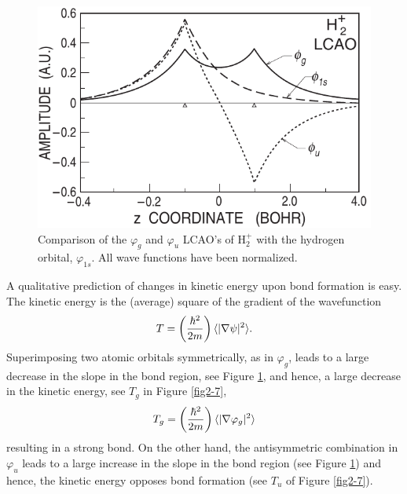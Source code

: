 \begin{figure}
\includegraphics[scale=0.75]{fig2-06}
\caption{Comparison of the $\varphi_g$ and $\varphi_u$ LCAO's of
  H$_2^+$ with the hydrogen orbital, $\varphi_{1s}$. All wave
  functions have been normalized.}
\label{fig2-6}
\end{figure}

A qualitative prediction of changes in kinetic energy upon bond formation 
is easy. The kinetic energy is the (average) square of the gradient of the 
wavefunction
\begin{equation}
T = \left( {\hbar^2 \over 2m} \right) \langle \vert \nabla \psi 
\vert^2 \rangle.
\end{equation}
Superimposing two atomic orbitals symmetrically, as in $\varphi_g$,
leads to a large decrease in the slope in the bond region, see Figure
\ref{fig2-6}, and hence, a large decrease in the kinetic energy, see
$T_g$ in Figure \ref{fig2-7},
\begin{equation}
 T_g = \left( {\hbar^2 \over 2m} \right) \langle \vert \nabla \varphi_g 
  \vert^2 \rangle
\end{equation}
resulting in a strong bond. On the other hand, the antisymmetric
combination in $\varphi_u$ leads to a large increase in the slope in
the bond region (see Figure \ref{fig2-6}) and hence, the kinetic
energy opposes bond formation (see $T_u$ of Figure \ref{fig2-7}).

